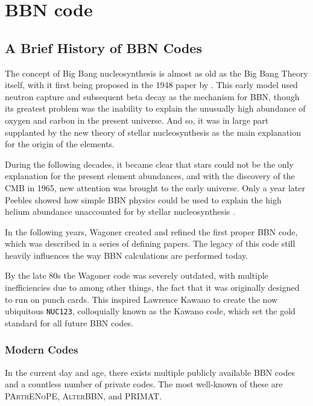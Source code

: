 
\chapter{BBN code}
\label{chap:BBNcode}

\section{A Brief History of BBN Codes}
\label{sec:BBN_history}

The concept of Big Bang nucleosynthesis is almost as old as the Big Bang Theory itself, with it first being proposed in the 1948 paper by \textcite{Gamov48}. This early model used neutron capture and subsequent beta decay as the mechanism for BBN, though its greatest problem was the inability to explain the unusually high abundance of oxygen and carbon in the present universe. And so, it was in large part supplanted by the new theory of stellar nucleosynthesis as the main explanation for the origin of the elements. 

During the following decades, it became clear that stars could not be the only explanation for the present element abundances, and with the discovery of the CMB in 1965, new attention was brought to the early universe. 
Only a year later Peebles showed how simple BBN physics could be used to explain the high helium abundance unaccounted for by stellar nucleosynthesis \cite{Peebles66}.

In the following years, Wagoner created and refined the first proper BBN code, which was described in a series of defining papers\cite{Wagoner67}\cite{Wagoner69}\cite{Wagoner72}. The legacy of this code still heavily influences the way BBN calculations are performed today.

By the late 80s the Wagoner code was severely outdated, with multiple inefficiencies due to among other things, the fact that it was originally designed to run on punch cards. This inspired Lawrence Kawano to create the now ubiquitous \texttt{NUC123}, colloquially known as the Kawano code\cite{Kawano}, which set the gold standard for all future BBN codes. 

\subsection{Modern Codes}
\label{sec:newcodes}
In the current day and age, there exists multiple publicly available BBN codes and a countless number of private codes. The most well-known of these are \textsc{PArthENoPE}, \textsc{AlterBBN}, and PRIMAT.

